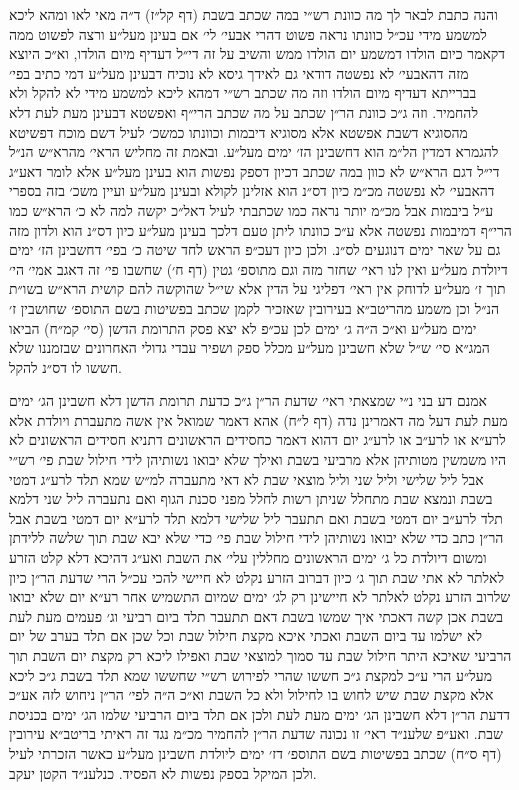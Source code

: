 \documentclass[12pt, openany]{book}
\begin{document}
\begin{multicols}{2}
והנה כתבת לבאר לך מה כוונת רש״י במה שכתב בשבת (דף קל״ז) ד״ה מאי לאו ומהא ליכא למשמע מידי עכ״ל כוונתו נראה פשוט דהרי אבעי׳ לי׳ אם בעינן מעל״ע ורצה לפשוט ממה דקאמר כיום הולדו דמשמע יום הולדו ממש והשיב על זה די״ל דעדיף מיום הולדו, וא״כ היוצא מזה דהאבעי׳ לא נפשטה דודאי גם לאידך גיסא לא נוכיח דבעינן מעל״ע דמי כתיב בפי׳ בברייתא דעדיף מיום הולדו וזה מה שכתב רש״י דמהא ליכא למשמע מידי לא להקל ולא להחמיר. וזה ג״כ כוונת הר״ן שכתב על מה שכתב הרי״ף ואפשטא דבעינן מעת לעת דלא מהסוגיא דשבת אפשטא אלא מסוגיא דיבמות וכוונתו כמשכ׳ לעיל דשם מוכח דפשיטא להגמרא דמדין הל״מ הוא דחשבינן הז׳ ימים מעל״ע. ובאמת זה מחליש הראי׳ מהרא״ש הנ״ל די״ל דגם הרא״ש לא כוון במה שכתב דכיון דספק נפשות הוא בעינן מעל״ע אלא לומר דאע״ג דהאבעי׳ לא נפשטה מכ״מ כיון דס״נ הוא אזלינן לקולא ובעינן מעל״ע ועיין משכ׳ בזה בספרי ע״ל ביבמות אבל מכ״מ יותר נראה כמו שכתבתי לעיל דאל״כ יקשה למה לא כ׳ הרא״ש כמו הרי״ף דמיבמות נפשטה אלא ע״כ כוונתו ליתן טעם דלכך בעינן מעל״ע כיון דס״נ הוא ולדון מזה גם על שאר ימים דנוגעים לס״נ. ולכן כיון דעכ״פ הראש לחד שיטה כ׳ בפי׳ דחשבינן הז׳ ימים דיולדת מעל״ע ואין לנו ראי׳ שחזר מזה וגם מתוספ׳ גטין (דף ח׳) שחשבו פי׳ זה דאגב אמי׳ הי׳ תוך ז׳ מעל״ע לדוחק אין ראי׳ דפליגי על הדין אלא שי״ל שהוקשה להם קושית הרא״ש בשו״ת הנ״ל וכן משמע מהריטב״א בעירובין שאזכיר לקמן שכתב בפשיטות בשם התוספ׳ שחושבין ז׳ ימים מעל״ע וא״כ ה״ה ג׳ ימים לכן עכ״פ לא יצא פסק התרומת הדשן (סי׳ קמ״ח) הביאו המג״א סי׳ ש״ל שלא חשבינן מעל״ע מכלל ספק ושפיר עבדי גדולי האחרונים שבזמננו שלא חששו לו דס״נ להקל.\\\vspace{0pt}

אמנם דע בני נ״י שמצאתי ראי׳ שדעת הר״ן ג״כ כדעת תרומת הדשן דלא חשבינן הג׳ ימים מעת לעת דעל מה דאמרינן נדה (דף ל״ח) אהא דאמר שמואל אין אשה מתעברת ויולדת אלא לרע״א או לרע״ב או לרע״ג יום דהוא דאמר כחסידים הראשונים דתניא חסידים הראשונים לא היו משמשין מטותיהן אלא מרביעי בשבת ואילך שלא יבואו נשותיהן לידי חילול שבת פי׳ רש״י אבל ליל שלישי וליל שני וליל מוצאי שבת לא דאי מתעברה למ״ש שמא תלד לרע״ג דמטי בשבת ונמצא שבת מתחלל שניתן רשות לחלל מפני סכנת הגוף ואם נתעברה ליל שני דלמא תלד לרע״ב יום דמטי בשבת ואם תתעבר ליל שלישי דלמא תלד לרע״א יום דמטי בשבת אבל הר״ן כתב כדי שלא יבואו נשותיהן לידי חילול שבת פי׳ כדי שלא יבא שבת תוך שלשה ללידתן ומשום דיולדת כל ג׳ ימים הראשונים מחללין עלי׳ את השבת ואע״ג דהיכא דלא קלט הזרע לאלתר לא אתי שבת תוך ג׳ כיון דברוב הזרע נקלט לא חיישי להכי עכ״ל הרי שדעת הר״ן כיון שלרוב הזרע נקלט לאלתר לא חיישינן רק לג׳ ימים שמיום התשמיש אחר רע״א יום שלא יבואו בשבת אכן קשה דאכתי איך שמשו בשבת דאם תתעבר תלד ביום רביעי וג׳ פעמים מעת לעת לא ישלמו עד ביום השבת ואכתי איכא מקצת חילול שבת וכל שכן אם תלד בערב של יום הרביעי שאיכא היתר חילול שבת עד סמוך למוצאי שבת ואפילו ליכא רק מקצת יום השבת תוך מעל״ע הרי ע״כ למקצת ג״כ חששו שהרי לפירוש רש״י שחששו שמא תלד בשבת ג״כ ליכא אלא מקצת שבת שיש לחוש בו לחילול ולא כל השבת וא״כ ה״ה לפי׳ הר״ן ניחוש לזה אע״כ דדעת הר״ן דלא חשבינן הג׳ ימים מעת לעת ולכן אם תלד ביום הרביעי שלמו הג׳ ימים בכניסת שבת. ואע״פ שלענ״ד ראי׳ זו נכונה שדעת הר״ן להחמיר מכ״מ נגד זה ראיתי בריטב״א עירובין (דף ס״ח) שכתב בפשיטות בשם התוספ׳ דז׳ ימים ליולדת חשבינן מעל״ע כאשר הזכרתי לעיל ולכן המיקל בספק נפשות לא הפסיד. כנלענ״ד הקטן יעקב.\\\vspace{0pt}

\end{multicols}\newpage
\end{document}
